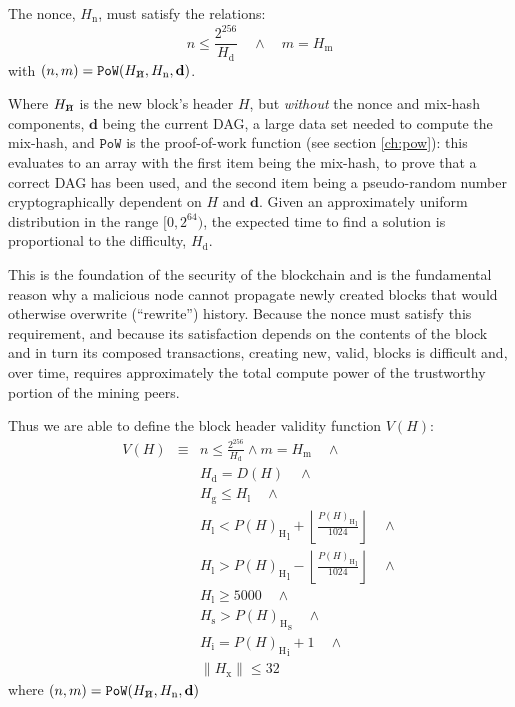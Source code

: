 \documentclass[9pt,oneside]{amsart}
\makeatletter
\newcommand{\linkdest}[1]{\Hy@raisedlink{\hypertarget{#1}{}}}
\newcommand{\hcancel}[1]{%
    \tikz[baseline=(tocancel.base)]{
        \node[inner sep=0pt,outer sep=0pt] (tocancel) {#1};
        \draw[black] (tocancel.south west) -- (tocancel.north east);
    }%
}%
\makeatother
\begin{document}
\begin{multicols}{2}
The nonce, \linkdest{H__n}\hyperlink{block_nonce_H__n}{$H_{\mathrm{n}}$}, must satisfy the relations:
\begin{equation}
n \leqslant \frac{2^{256}}{H_{\mathrm{d}}} \quad \wedge \quad m = H_{\mathrm{m}}
\end{equation}
with $(n, m) = \mathtt{PoW}(H_{\hcancel{n}}, H_{\mathrm{n}}, \mathbf{d})$.

\hypertarget{block_header_without_nonce_and_mixmash_h__cancel_n}{}\linkdest{H_cancel_n}Where $H_{\hcancel{n}}$ is the new block's header $H$, but \textit{without} the nonce and mix-hash components, $\mathbf{d}$ being the current DAG, a large data set needed to compute the mix-hash, and $\mathtt{PoW}$ is the proof-of-work function (see section \ref{ch:pow}): this evaluates to an array with the first item being the mix-hash, to prove that a correct DAG has been used, and the second item being a pseudo-random number cryptographically dependent on $H$ and $\mathbf{d}$. Given an approximately uniform distribution in the range $[0, 2^{64})$, the expected time to find a solution is proportional to the difficulty, $H_{\mathrm{d}}$.

This is the foundation of the security of the blockchain and is the fundamental reason why a malicious node cannot propagate newly created blocks that would otherwise overwrite (``rewrite'') history. Because the nonce must satisfy this requirement, and because its satisfaction depends on the contents of the block and in turn its composed transactions, creating new, valid, blocks is difficult and, over time, requires approximately the total compute power of the trustworthy portion of the mining peers.

\hypertarget{block_header_validity_function}{}Thus we are able to define the block header validity function $V(H)$:
\begin{eqnarray}
V(H) & \equiv &  n \leqslant \frac{2^{256}}{H_{\mathrm{d}}} \wedge m = H_{\mathrm{m}} \quad \wedge \\
\nonumber & & H_{\mathrm{d}} = D(H) \quad \wedge \\
\nonumber& & H_{\mathrm{g}} \le H_{\mathrm{l}}  \quad \wedge \\
\nonumber& & H_{\mathrm{l}} < {P(H)_{\mathrm{H}}}_{\mathrm{l}} + \left\lfloor\frac{{P(H)_{\mathrm{H}}}_{\mathrm{l}}}{1024}\right\rfloor  \quad \wedge \\
\nonumber& & H_{\mathrm{l}} > {P(H)_{\mathrm{H}}}_{\mathrm{l}} - \left\lfloor\frac{{P(H)_{\mathrm{H}}}_{\mathrm{l}}}{1024}\right\rfloor  \quad \wedge \\
\nonumber& & H_{\mathrm{l}} \geqslant 5000  \quad \wedge \\
\nonumber& & H_{\mathrm{s}} > {P(H)_{\mathrm{H}}}_{\mathrm{s}} \quad \wedge \\
\nonumber& & H_{\mathrm{i}} = {P(H)_{\mathrm{H}}}_{\mathrm{i}} +1 \quad \wedge \\
\nonumber& & \lVert H_{\mathrm{x}} \rVert \le 32
\end{eqnarray}
where $(n, m) = \mathtt{PoW}(H_{\hcancel{n}}, H_{\mathrm{n}}, \mathbf{d})$


\end{multicols}
\end{document}
